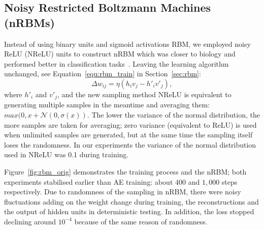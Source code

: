 \subsection{Noisy Restricted Boltzmann Machines (nRBMs)}
Instead of using binary units and sigmoid activations \DIFdelbegin {}\DIFdelend \DIFaddbegin {}\DIFaddend RBM, we employed noisy ReLU (NReLU) units to construct \DIFaddbegin {}\DIFaddend nRBM which was closer to biology and performed better in classification tasks~\DIFdelbegin {}\DIFdelend \DIFaddbegin {}\DIFaddend .
Leaving the learning algorithm unchanged, see Equation~\ref{equ:rbm_train} in Section~\ref{sec:rbm}:
\begin{equation}
\Delta w_{ij} = \eta (h_iv_j - h'_iv'_j),
\label{equ:rbm}
\end{equation} 
where \DIFaddbegin {}\DIFaddend $h'_i$ and $v'_j$\DIFdelbegin {}\DIFdelend , and the new sampling method NReLU is equivalent to generating multiple samples in the meantime and averaging them: $max(0, x+\mathcal{N}(0, \sigma(x))$.
The lower the variance of the normal distribution, the more samples are taken for averaging;
zero variance (equivalent to ReLU) is used when unlimited samples are generated, but at the same time the sampling itself loses the randomness.
In our experiments the variance of the normal distribution used in NReLU was 0.1 during training.


Figure~\ref{fig:rbm_orig} demonstrates the training process and the \DIFdelbegin {}\DIFdelend \DIFaddbegin {}\DIFaddend nRBM; both experiments stabilised earlier than AE training: about 400 and $1,000$ steps respectively.
Due to \DIFaddbegin {}\DIFaddend randomness of the sampling in \DIFaddbegin {}\DIFaddend nRBM, there were noisy fluctuations adding on the weight change during training, the reconstructions and the output of hidden units in deterministic testing.
In addition, the loss stopped declining around $10^{-4}$ because of the same reason of randomness.

